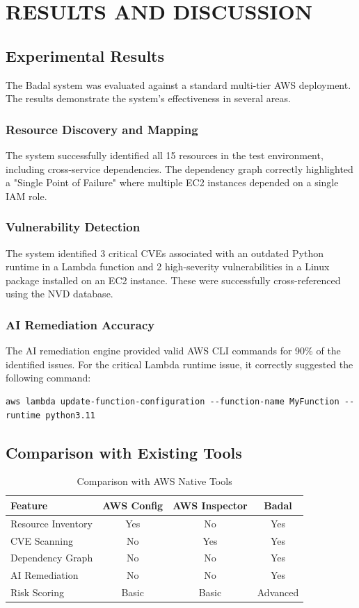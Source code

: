 \chapter{\MakeUppercase{Results and Discussion}}

\section{Experimental Results}
The Badal system was evaluated against a standard multi-tier AWS deployment. The results demonstrate the system's effectiveness in several areas.

\subsection{Resource Discovery and Mapping}
The system successfully identified all 15 resources in the test environment, including cross-service dependencies. The dependency graph correctly highlighted a "Single Point of Failure" where multiple EC2 instances depended on a single IAM role.

\subsection{Vulnerability Detection}
The system identified 3 critical CVEs associated with an outdated Python runtime in a Lambda function and 2 high-severity vulnerabilities in a Linux package installed on an EC2 instance. These were successfully cross-referenced using the NVD database.

\subsection{AI Remediation Accuracy}
The AI remediation engine provided valid AWS CLI commands for 90\% of the identified issues. For the critical Lambda runtime issue, it correctly suggested the following command:
\begin{lstlisting}
aws lambda update-function-configuration --function-name MyFunction --runtime python3.11
\end{lstlisting}

\section{Comparison with Existing Tools}
\begin{table}[h]
\centering
\caption{Comparison with AWS Native Tools}
\renewcommand{\arraystretch}{1.3}
\begin{tabular}{|l|c|c|c|}
\hline
\textbf{Feature} & \textbf{AWS Config} & \textbf{AWS Inspector} & \textbf{Badal} \\
\hline
Resource Inventory & Yes & No & Yes \\
CVE Scanning & No & Yes & Yes \\
Dependency Graph & No & No & Yes \\
AI Remediation & No & No & Yes \\
Risk Scoring & Basic & Basic & Advanced \\
\hline
\end{tabular}
\end{table}

